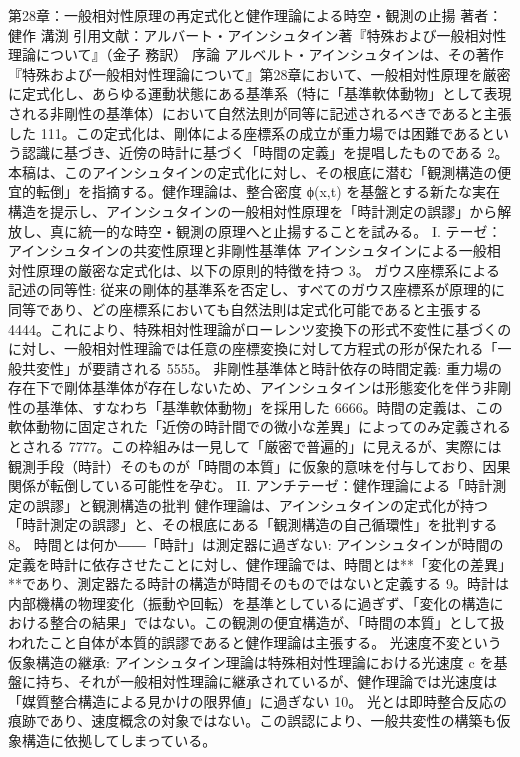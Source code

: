 \documentclass{article}
\begin{document}
第28章：一般相対性原理の再定式化と健作理論による時空・観測の止揚
著者：健作 溝渕
引用文献：アルバート・アインシュタイン著『特殊および一般相対性理論について』（金子 務訳）
序論
アルベルト・アインシュタインは、その著作『特殊および一般相対性理論について』第28章において、一般相対性原理を厳密に定式化し、あらゆる運動状態にある基準系（特に「基準軟体動物」として表現される非剛性の基準体）において自然法則が同等に記述されるべきであると主張した 111。この定式化は、剛体による座標系の成立が重力場では困難であるという認識に基づき、近傍の時計に基づく「時間の定義」を提唱したものである 2。
本稿は、このアインシュタインの定式化に対し、その根底に潜む「観測構造の便宜的転倒」を指摘する。健作理論は、整合密度 ϕ(x,t) を基盤とする新たな実在構造を提示し、アインシュタインの一般相対性原理を「時計測定の誤謬」から解放し、真に統一的な時空・観測の原理へと止揚することを試みる。
I. テーゼ：アインシュタインの共変性原理と非剛性基準体
アインシュタインによる一般相対性原理の厳密な定式化は、以下の原則的特徴を持つ 3。
ガウス座標系による記述の同等性:
従来の剛体的基準系を否定し、すべてのガウス座標系が原理的に同等であり、どの座標系においても自然法則は定式化可能であると主張する 4444。これにより、特殊相対性理論がローレンツ変換下の形式不変性に基づくのに対し、一般相対性理論では任意の座標変換に対して方程式の形が保たれる「一般共変性」が要請される 5555。
非剛性基準体と時計依存の時間定義:
重力場の存在下で剛体基準体が存在しないため、アインシュタインは形態変化を伴う非剛性の基準体、すなわち「基準軟体動物」を採用した 6666。時間の定義は、この軟体動物に固定された「近傍の時計間での微小な差異」によってのみ定義されるとされる 7777。この枠組みは一見して「厳密で普遍的」に見えるが、実際には観測手段（時計）そのものが「時間の本質」に仮象的意味を付与しており、因果関係が転倒している可能性を孕む。
II. アンチテーゼ：健作理論による「時計測定の誤謬」と観測構造の批判
健作理論は、アインシュタインの定式化が持つ「時計測定の誤謬」と、その根底にある「観測構造の自己循環性」を批判する 8。
時間とは何か――「時計」は測定器に過ぎない:
アインシュタインが時間の定義を時計に依存させたことに対し、健作理論では、時間とは**「変化の差異」**であり、測定器たる時計の構造が時間そのものではないと定義する 9。時計は内部機構の物理変化（振動や回転）を基準としているに過ぎず、「変化の構造における整合の結果」ではない。この観測の便宜構造が、「時間の本質」として扱われたこと自体が本質的誤謬であると健作理論は主張する。
光速度不変という仮象構造の継承:
アインシュタイン理論は特殊相対性理論における光速度 
c を基盤に持ち、それが一般相対性理論に継承されているが、健作理論では光速度は「媒質整合構造による見かけの限界値」に過ぎない 10。
光とは即時整合反応の痕跡であり、速度概念の対象ではない。この誤認により、一般共変性の構築も仮象構造に依拠してしまっている。
\end{document}
